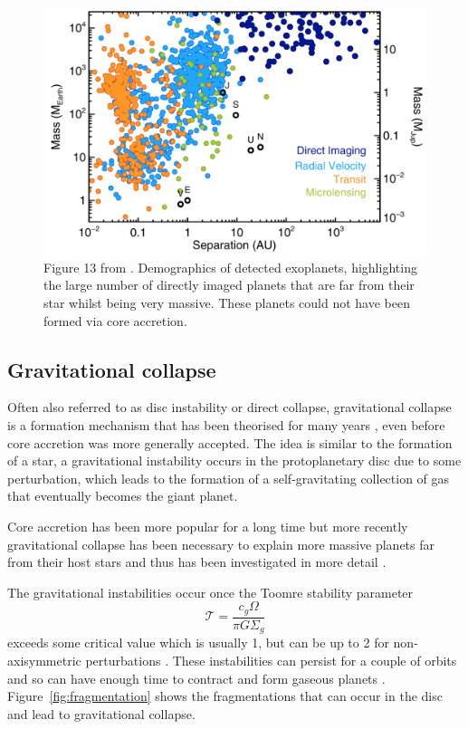 \documentclass[twocolumn]{aastex631}
\begin{document}
\begin{figure}[tb]
    \centering
    \includegraphics[width=\columnwidth]{exoplanet_demographics.png}
    \caption{Figure 13 from \citet{Bowler+2016}. Demographics of detected exoplanets, highlighting the large number of directly imaged planets that are far from their star whilst being very massive. These planets could not have been formed via core accretion.}
    \label{fig:demographics}
\end{figure}

\subsection{Gravitational collapse}

Often also referred to as disc instability or direct collapse, gravitational collapse is a formation mechanism that has been theorised for many years \citep{Kuiper+1951,Cameron+1982}, even before core accretion was more generally accepted. The idea is similar to the formation of a star, a gravitational instability occurs in the protoplanetary disc due to some perturbation, which leads to the formation of a self-gravitating collection of gas that eventually becomes the giant planet.

Core accretion has been more popular for a long time but more recently gravitational collapse has been necessary to explain more massive planets far from their host stars and thus has been investigated in more detail \citep{Durisen+2007}.

The gravitational instabilities occur once the Toomre stability parameter \citep{Toomre+1964}
\begin{equation}
    \mathcal{T} = \frac{c_g \Omega}{\pi G \Sigma_g}
\end{equation}
exceeds some critical value which is usually 1, but can be up to 2 for non-axisymmetric perturbations \citep{Binney+1987}. These instabilities can persist for a couple of orbits and so can have enough time to contract and form gaseous planets \citep{Forgan+2017}. Figure~\ref{fig:fragmentation} shows the fragmentations that can occur in the disc and lead to gravitational collapse.
\end{document}
